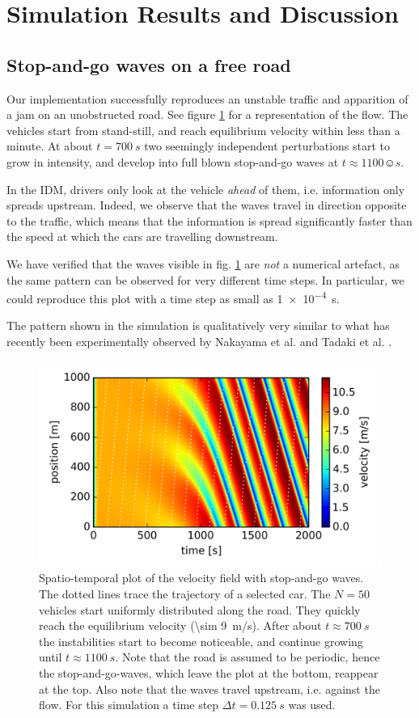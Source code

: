 \section{Simulation Results and Discussion}
\subsection{Stop-and-go waves on a free road}
Our implementation successfully reproduces an unstable traffic and apparition of a jam on an unobstructed road. See figure \ref{fig:free_road} for a representation of the flow. The vehicles start from stand-still, and reach equilibrium velocity within less than a minute. At about $t=\SI{700}{s}$ two seemingly independent perturbations start to grow in intensity, and develop into full blown stop-and-go waves at $t\approx \SI{1100}☺{s}$.

In the IDM, drivers only look at the vehicle \emph{ahead} of them, i.e. information only spreads upstream. Indeed, we observe that the waves travel in direction opposite to the traffic, which means that the information is spread significantly faster than the speed at which the cars are travelling downstream.

We have verified that the waves visible in fig. \ref{fig:free_road} are \emph{not} a numerical artefact, as the same pattern can be observed for very different time steps. In particular, we could reproduce this plot with a time step as small as \SI{1e-4}{s}.

The pattern shown in the simulation is qualitatively very similar to what has recently been experimentally observed by Nakayama et al. \cite{nakayama2009} and Tadaki et al. \cite{tadaki2013}.
\begin{figure}
    \centering
    \includegraphics[width=5in]{../img/free_road.png}
    \caption{Spatio-temporal plot of the velocity field with stop-and-go waves. The dotted lines trace the trajectory of a selected car. The $N=50$ vehicles start uniformly distributed along the road. They quickly reach the equilibrium velocity (\SI{\sim 9}{m/s}). After about $t\approx\SI{700}{s}$ the instabilities start to become noticeable, and continue growing until $t\approx \SI{1100}{s}$. Note that the road is assumed to be periodic, hence the stop-and-go-waves, which leave the plot at the bottom, reappear at the top. Also note that the waves travel upstream, i.e. against the flow. For this simulation a time step $\Delta t=\SI{0.125}{s}$ was used.}
    \label{fig:free_road}
\end{figure}


